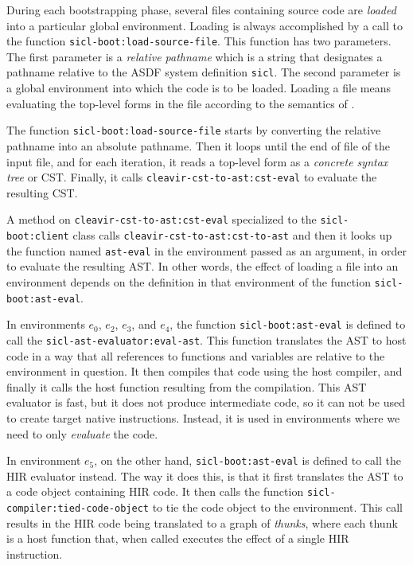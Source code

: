 During each bootstrapping phase, several files containing \sysname{}
source code are \emph{loaded} into a particular global environment.
Loading is always accomplished by a call to the function
\texttt{sicl-boot:load-source-file}.  This function has two
parameters.  The first parameter is a \emph{relative pathname} which
is a string that designates a pathname relative to the ASDF system
definition \texttt{sicl}.  The second parameter is a global
environment into which the code is to be loaded.  Loading a file means
evaluating the top-level forms in the file according to the semantics
of \commonlisp{}.

The function \texttt{sicl-boot:load-source-file} starts by converting
the relative pathname into an absolute pathname.  Then it loops until
the end of file of the input file, and for each iteration, it reads a
top-level form as a \emph{concrete syntax tree} or CST.  Finally, it
calls \texttt{cleavir-cst-to-ast:cst-eval} to evaluate the resulting
CST.

A method on \texttt{cleavir-cst-to-ast:cst-eval} specialized to the
\texttt{sicl-boot:client} class calls
\texttt{cleavir-cst-to-ast:cst-to-ast} and then it looks up the
function named \texttt{ast-eval} in the environment passed as an
argument, in order to evaluate the resulting AST.  In other words,
the effect of loading a file into an environment depends on the
definition in that environment of the function
\texttt{sicl-boot:ast-eval}.

In environments $e_0$, $e_2$, $e_3$, and $e_4$, the function
\texttt{sicl-boot:ast-eval} is defined to call the
\texttt{sicl-ast-evaluator:eval-ast}.  This function translates the
AST to host code in a way that all references to functions and
variables are relative to the environment in question.  It then
compiles that code using the host compiler, and finally it calls the
host function resulting from the compilation.  This AST evaluator is
fast, but it does not produce intermediate code, so it can not be used
to create target native instructions.  Instead, it is used in
environments where we need to only \emph{evaluate} the code.

In environment $e_5$, on the other hand, \texttt{sicl-boot:ast-eval}
is defined to call the HIR evaluator instead.  The way it does this,
is that it first translates the AST to a code object containing HIR
code.  It then calls the function
\texttt{sicl-compiler:tied-code-object} to tie the code object to the
environment.  This call results in the HIR code being translated to a
graph of \emph{thunks}, where each thunk is a host function that, when
called executes the effect of a single HIR instruction.

